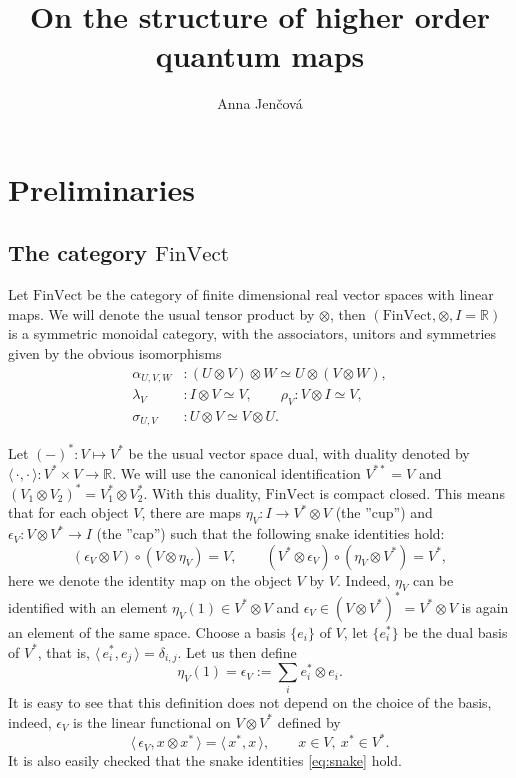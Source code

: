 \documentclass[12pt]{article}
\title{On the structure of  higher order quantum maps}
\author{Anna Jen\v cov\'a}
\theoremstyle{definition}
\theoremstyle{remark}
\def\<{\langle\,}
\def\>{\,\rangle}
\def \FV{\mathrm{FinVect}}
\begin{document}
\maketitle

\section{Preliminaries}

\subsection{The category $\FV$} \label{sec:fv}

Let  $\FV$ be the category of finite dimensional real vector spaces with linear maps. 
We will denote the usual tensor product by $\otimes$, then  $(\FV,\otimes, I=\mathbb R)$
is a symmetric monoidal category, with the associators, unitors and symmetries given by
the obvious isomorphisms 
\begin{align*}
\alpha_{U,V,W}&:(U\otimes V)\otimes W\simeq U\otimes (V\otimes W), \\
\lambda_V&: I\otimes
V\simeq
V, \qquad \rho_V: V\otimes I\simeq V,\\
\sigma_{U,V}&: U\otimes V\simeq V\otimes U.
\end{align*}




Let  $(-)^*: V\mapsto V^*$ be the usual vector space dual, with duality denoted by
$\<\cdot,\cdot\>: V^*\times V\to \mathbb R$. We will use the canonical identification
$V^{**}=V$ and $(V_1\otimes V_2)^*=V_1^*\otimes V_2^*$. With this duality, $\FV$ is
compact closed. This means that for each object $V$, there are maps $\eta_V: I\to V^*\otimes
V$ (the ''cup'') and $\epsilon_V: V\otimes V^*\to I$ (the ''cap'') such that the following snake
identities hold:
\begin{equation}\label{eq:snake}
(\epsilon_V\otimes V)\circ (V\otimes \eta_V)=V,\qquad (V^*\otimes \epsilon_V)\circ
(\eta_V\otimes V^*)=V^*,
\end{equation}
here we denote the identity map on the object $V$ by $V$. Indeed, $\eta_V$ can be
identified with an element $\eta_V(1)\in V^*\otimes V$ and   $\epsilon_V\in (V\otimes
V^*)^*=V^*\otimes V$ is again an element of the same space.  Choose a basis
$\{e_i\}$ of $V$, let $\{e_i^*\}$ be the dual basis of $V^*$, that is,
$\<e_i^*,e_j\>=\delta_{i,j}$. Let us then define
\[
\eta_V(1)=\epsilon_V:=\sum_i e_i^*\otimes e_i.
\]
It is easy to see that this definition does not depend on the choice of the basis, indeed,
$\epsilon_V$ is the linear functional on $V\otimes V^*$ defined by
\[
\<\epsilon_V, x\otimes x^*\>=\<x^*,x\>,\qquad x\in V, \ x^*\in V^*.
\]
It is also easily checked that the snake identities \eqref{eq:snake} hold.
\end{document}
